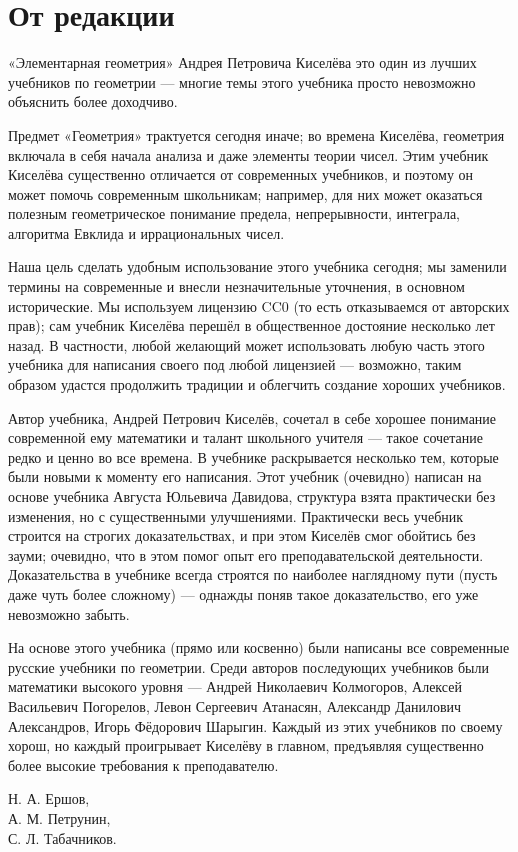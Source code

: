 \section*{От редакции}


«Элементарная геометрия» Андрея Петровича Киселёва это один из лучших учебников по геометрии —
многие темы этого учебника просто невозможно объяснить более доходчиво.

Предмет «Геометрия» трактуется сегодня иначе;
во времена Киселёва, геометрия включала в себя начала анализа и даже элементы теории чисел.
Этим учебник Киселёва существенно отличается от современных учебников, и поэтому он может помочь современным школьникам;
например, для них может оказаться полезным геометрическое понимание предела, непрерывности, интеграла, алгоритма Евклида и иррациональных чисел.

Наша цель сделать удобным использование этого учебника сегодня;
мы заменили термины на современные и внесли незначительные уточнения, в основном исторические. 
Мы используем лицензию CC0 (то есть отказываемся от авторских прав); сам учебник Киселёва перешёл в общественное достояние несколько лет назад.
В частности, любой желающий может использовать любую часть этого учебника для написания своего под любой лицензией —
возможно, таким образом удастся продолжить традиции и облегчить создание хороших учебников. 

Автор учебника, Андрей Петрович Киселёв, сочетал в себе хорошее понимание современной ему математики и талант школьного учителя — такое сочетание редко и ценно во все времена.
В учебнике раскрывается несколько тем, которые были новыми к моменту его написания. 
Этот учебник (очевидно) написан на основе учебника Августа Юльевича Давидова, структура взята практически без изменения, но с существенными улучшениями.
Практически весь учебник строится на строгих доказательствах, и при этом Киселёв смог обойтись без зауми;
очевидно, что в этом помог опыт его преподавательской деятельности.
Доказательства в учебнике всегда строятся по наиболее наглядному пути (пусть даже чуть более сложному) — однажды поняв такое доказательство, его уже невозможно забыть. 

На основе этого учебника (прямо или косвенно) были написаны все современные русские учебники по геометрии.
Среди авторов последующих учебников были математики высокого уровня — 
Андрей Николаевич Колмогоров, 
Алексей Васильевич Погорелов, 
Левон Сергеевич Атанасян, 
Александр Данилович Александров, 
Игорь Фёдорович Шарыгин.
Каждый из этих учебников по своему хорош, но каждый проигрывает Киселёву в главном,
предъявляя существенно более высокие требования к преподавателю.

\begin{flushright}
Н. А. Ершов,\\ 
А. М. Петрунин,\\ 
С. Л. Табачников.        
\end{flushright}
\clearpage
